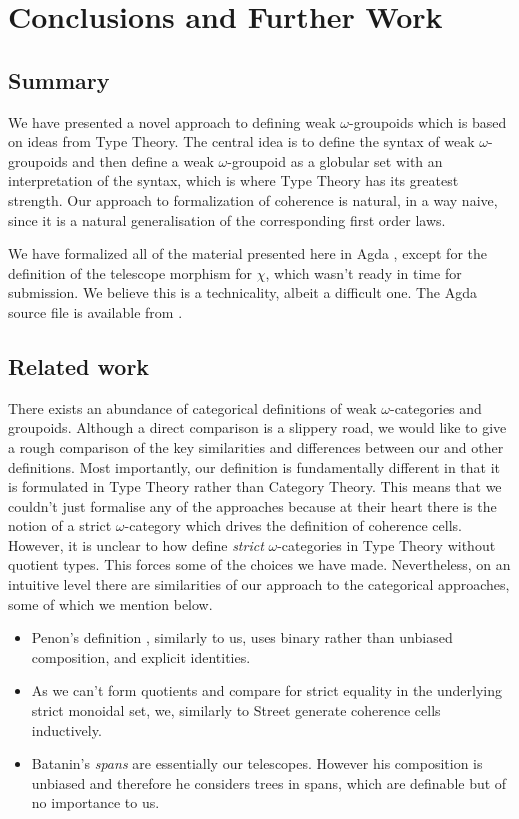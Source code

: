 \section{Conclusions and Further Work}
\label{sec:conclusions}

\subsection{Summary}
We have presented a novel approach to defining weak $\omega$-groupoids
which is based on ideas from Type Theory. The central idea is to
define the syntax of weak $\omega$-groupoids and then define a weak
$\omega$-groupoid as a globular set with an interpretation of the
syntax, which is where Type Theory has its greatest strength. Our
approach to formalization of coherence is natural, in a way naive,
since it is a natural generalisation of the corresponding first order
laws.

We have formalized all of the material presented here in Agda
\cite{agda}, except for the definition of the telescope morphism for
$\chi$, which wasn't ready in time for submission. We believe this is
a technicality, albeit a difficult one. The Agda source file is available
from \cite{coreagda}.


\subsection{Related work}
There exists an abundance of categorical definitions of weak
$\omega$-categories and groupoids.  Although a direct comparison is a
slippery road, we would like to give a rough comparison of the key
similarities and differences between our and other definitions. Most
importantly, our definition is fundamentally different in that it is
formulated in Type Theory rather than Category Theory. This means that
we couldn't just formalise any of the approaches
\cite{penon:1999,batanin98:monoidal-globular,leinster:2000} because at
their heart there is the notion of a strict $\omega$-category which
drives the definition of coherence cells. However, it is unclear to how define
\emph{strict} $\omega$-categories in Type Theory
without quotient types. This forces some of the choices we have
made. Nevertheless, on an intuitive level there are similarities of our approach to the
categorical approaches, some of which we mention below.
\begin{itemize}
\item Penon's definition \cite{penon:1999}, similarly to us, uses
  binary rather than unbiased composition, and explicit
  identities. 
\item As we can't form quotients and compare for strict equality in
  the underlying strict monoidal set, we, similarly to Street
  \cite{street87:simplexes} generate coherence cells
  inductively. 
\item Batanin's \emph{spans} are essentially our telescopes. However
  his composition is unbiased and therefore he considers trees in
  spans, which are definable but of no importance to us.
\end{itemize}
%



